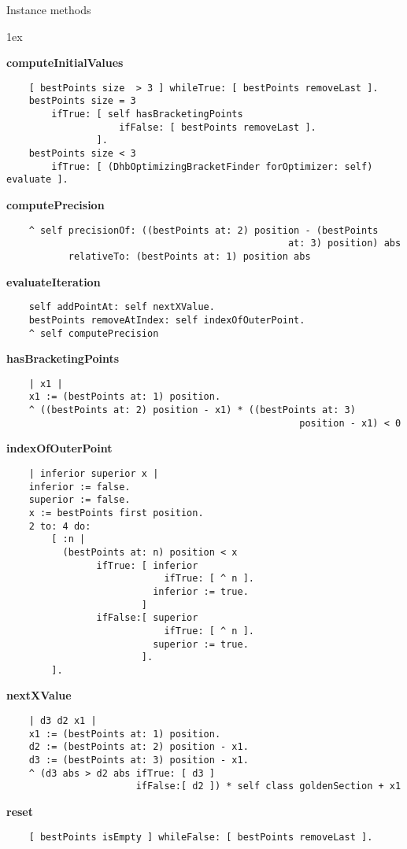 Instance methods
{\parskip 1ex\par\noindent}
{\bf computeInitialValues}
\begin{verbatim}
    [ bestPoints size  > 3 ] whileTrue: [ bestPoints removeLast ].
    bestPoints size = 3
        ifTrue: [ self hasBracketingPoints
                    ifFalse: [ bestPoints removeLast ].
                ].
    bestPoints size < 3
        ifTrue: [ (DhbOptimizingBracketFinder forOptimizer: self) evaluate ].
\end{verbatim}
{\bf computePrecision}
\begin{verbatim}
    ^ self precisionOf: ((bestPoints at: 2) position - (bestPoints 
                                                  at: 3) position) abs
           relativeTo: (bestPoints at: 1) position abs
\end{verbatim}
{\bf evaluateIteration}
\begin{verbatim}
    self addPointAt: self nextXValue.
    bestPoints removeAtIndex: self indexOfOuterPoint.
    ^ self computePrecision
\end{verbatim}
{\bf hasBracketingPoints}
\begin{verbatim}
    | x1 |
    x1 := (bestPoints at: 1) position.
    ^ ((bestPoints at: 2) position - x1) * ((bestPoints at: 3) 
                                                    position - x1) < 0
\end{verbatim}
{\bf indexOfOuterPoint}
\begin{verbatim}
    | inferior superior x |
    inferior := false.
    superior := false.
    x := bestPoints first position.
    2 to: 4 do:
        [ :n |
          (bestPoints at: n) position < x
                ifTrue: [ inferior
                            ifTrue: [ ^ n ].
                          inferior := true.
                        ]
                ifFalse:[ superior
                            ifTrue: [ ^ n ].
                          superior := true.
                        ].
        ].
\end{verbatim}
{\bf nextXValue}
\begin{verbatim}
    | d3 d2 x1 |
    x1 := (bestPoints at: 1) position.
    d2 := (bestPoints at: 2) position - x1.
    d3 := (bestPoints at: 3) position - x1.
    ^ (d3 abs > d2 abs ifTrue: [ d3 ]
                       ifFalse:[ d2 ]) * self class goldenSection + x1
\end{verbatim}
{\bf reset}
\begin{verbatim}
    [ bestPoints isEmpty ] whileFalse: [ bestPoints removeLast ].
\end{verbatim}

